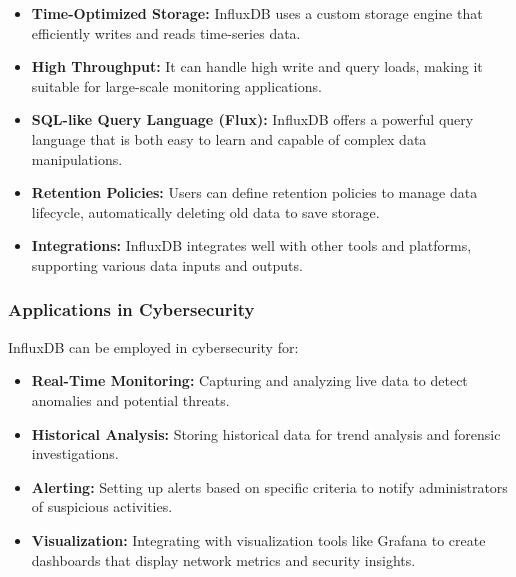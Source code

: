 \begin{itemize}
    \item \textbf{Time-Optimized Storage:} InfluxDB uses a custom storage engine that efficiently writes and reads time-series data.
    \item \textbf{High Throughput:} It can handle high write and query loads, making it suitable for large-scale monitoring applications.
    \item \textbf{SQL-like Query Language (Flux):} InfluxDB offers a powerful query language that is both easy to learn and capable of complex data manipulations.
    \item \textbf{Retention Policies:} Users can define retention policies to manage data lifecycle, automatically deleting old data to save storage.
    \item \textbf{Integrations:} InfluxDB integrates well with other tools and platforms, supporting various data inputs and outputs.
\end{itemize}

\subsubsection{Applications in Cybersecurity}

InfluxDB can be employed in cybersecurity for:

\begin{itemize}
    \item \textbf{Real-Time Monitoring:} Capturing and analyzing live data to detect anomalies and potential threats.
    \item \textbf{Historical Analysis:} Storing historical data for trend analysis and forensic investigations.
    \item \textbf{Alerting:} Setting up alerts based on specific criteria to notify administrators of suspicious activities.
    \item \textbf{Visualization:} Integrating with visualization tools like Grafana to create dashboards that display network metrics and security insights.
\end{itemize}

